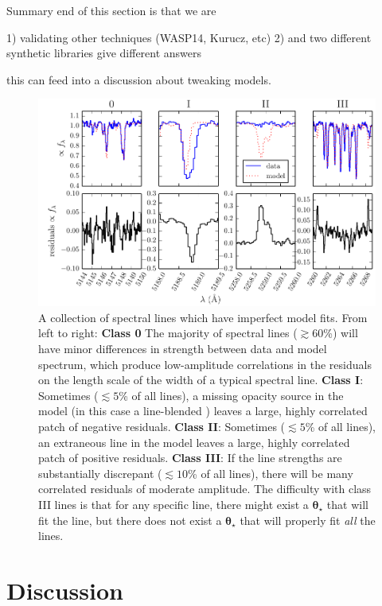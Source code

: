 \documentclass[iop,floatfix]{emulateapj}
\newcommand{\vt}{ {\bm \theta}}
\newcommand{\vtstar}{\vt_{\star}}
\begin{document}
Summary end of this section is that we are

1) validating other techniques (WASP14, Kurucz, etc)
2) and two different synthetic libraries give different answers

this can feed into a discussion about tweaking models.

\begin{figure}[!htb]
\begin{center}
  \includegraphics{figs/badlines.pdf}
  \caption{A collection of spectral lines which have imperfect model fits.
    From left to right: \textbf{Class 0} The majority of spectral lines
    ($\gtrsim 60$\%) will have minor differences in strength between data and
    model spectrum, which produce low-amplitude correlations in the residuals
    on the length scale of the width of a typical spectral line.  \textbf{Class
    I}: Sometimes ($\lesssim 5$\% of all lines), a missing opacity source in
    the model (in this case a line-blended ) leaves a large, highly correlated
    patch of negative residuals.  \textbf{Class II}: Sometimes ($\lesssim 5$\%
    of all lines), an extraneous line in the model leaves a large, highly
    correlated patch of positive residuals.  \textbf{Class III}: If the line strengths are
    substantially discrepant ($\lesssim 10$\% of all lines), there will be many
    correlated residuals of moderate amplitude.  The difficulty
    with class III lines is that for any specific line, there might exist a
    $\vtstar$ that will fit the line, but there does not exist a $\vtstar$ that
    will properly fit \emph{all} the lines.}
\label{fig:badlines}
\end{center}
\end{figure}

\section{Discussion}
\label{sec:discussion}
\end{document}
